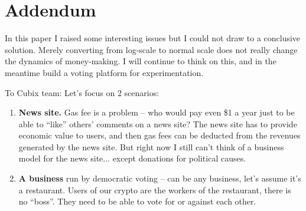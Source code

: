 \begin{itemize}

\end{itemize}

\section{Addendum}

In this paper I raised some interesting issues but I could not draw to a conclusive solution.  Merely converting from log-scale to normal scale does not really change the dynamics of money-making.  I will continue to think on this, and in the meantime build a voting platform for experimentation.

{\color{red}To Cubix team:} Let's focus on 2 scenarios:

\begin{enumerate}[label=(\Alph*)]
	\item \textbf{News site.}  Gas fee is a problem -- who would pay even \$1 a year just to be able to ``like'' others' comments on a news site?  The news site has to provide economic value to users, and then gas fees can be deducted from the revenues generated by the news site.  But right now I still can't think of a business model for the news site...  except donations for political causes.

	\item \textbf{A business} run by democratic voting -- can be any business, let's assume it's a restaurant.  Users of our crypto are the workers of the restaurant, there is no ``boss''.  They need to be able to vote for or against each other.
\end{enumerate}


